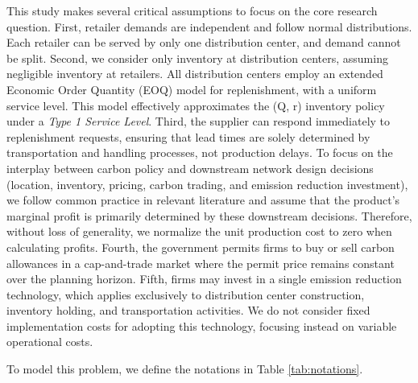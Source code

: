 \documentclass[]{article}
\theoremstyle{plain}%
\theoremstyle{definition}
\theoremstyle{remark}
\theoremstyle{plain}%
\begin{document}
    This study makes several critical assumptions to focus on the core research question. First, retailer demands are independent and follow normal distributions. Each retailer can be served by only one distribution center, and demand cannot be split. Second, we consider only inventory at distribution centers, assuming negligible inventory at retailers. All distribution centers employ an extended Economic Order Quantity (EOQ) model for replenishment, with a uniform service level. This model effectively approximates the (Q, r) inventory policy under a \textit{Type 1 Service Level}. Third, the supplier can respond immediately to replenishment requests, ensuring that lead times are solely determined by transportation and handling processes, not production delays. To focus on the interplay between carbon policy and downstream network design decisions (location, inventory, pricing, carbon trading, and emission reduction investment), we follow common practice in relevant literature and assume that the product's marginal profit is primarily determined by these downstream decisions. Therefore, without loss of generality, we normalize the unit production cost to zero when calculating profits. Fourth, the government permits firms to buy or sell carbon allowances in a cap-and-trade market where the permit price remains constant over the planning horizon. Fifth, firms may invest in a single emission reduction technology, which applies exclusively to distribution center construction, inventory holding, and transportation activities. We do not consider fixed implementation costs for adopting this technology, focusing instead on variable operational costs.
    
    To model this problem, we define the notations in Table \ref{tab:notations}. 
    
\end{document}
